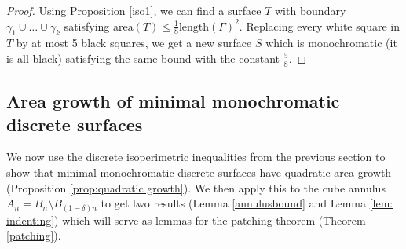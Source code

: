 \documentclass[11pt]{article}
\theoremstyle{remark}
\theoremstyle{definition}
\begin{document}
\begin{proof}
    Using Proposition \ref{iso1}, we can find a surface $T$ with boundary $\gamma_1\cup\dots\cup\gamma_k$ satisfying $\text{area}(T) \leq \frac{1}{8}\text{length}(\Gamma)^2$. Replacing every white square in $T$ by at most 5 black squares, we get a new surface $S$ which is monochromatic (it is all black) satisfying the same bound with the constant $\frac{5}{8}$. 
\end{proof}


\subsection{Area growth of minimal monochromatic discrete surfaces}\label{sec: area growth}

We now use the discrete isoperimetric inequalities from the previous section to show that minimal monochromatic discrete surfaces have quadratic area growth (Proposition \ref{prop:quadratic growth}). We then apply this to the cube annulus $A_n = B_n\setminus B_{(1-\delta)n}$ to get two results (Lemma \ref{annulusbound} and  Lemma \ref{lem: indenting}) which will serve as lemmas for the patching theorem (Theorem \ref{patching}). 
\end{document}
